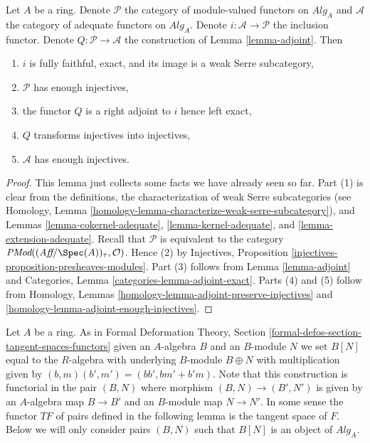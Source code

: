 \begin{lemma}
\label{lemma-enough-injectives}
Let $A$ be a ring. Denote $\mathcal{P}$ the category of module-valued
functors on $\textit{Alg}_A$ and $\mathcal{A}$ the category of adequate
functors on $\textit{Alg}_A$. Denote $i : \mathcal{A} \to \mathcal{P}$
the inclusion functor. Denote $Q : \mathcal{P} \to \mathcal{A}$
the construction of Lemma \ref{lemma-adjoint}.
Then
\begin{enumerate}
\item $i$ is fully faithful, exact, and its image is a weak Serre subcategory,
\item $\mathcal{P}$ has enough injectives,
\item the functor $Q$ is a right adjoint to $i$ hence left exact,
\item $Q$ transforms injectives into injectives,
\item $\mathcal{A}$ has enough injectives.
\end{enumerate}
\end{lemma}

\begin{proof}
This lemma just collects some facts we have already seen so far.
Part (1) is clear from the definitions, the characterization of
weak Serre subcategories (see
Homology, Lemma \ref{homology-lemma-characterize-weak-serre-subcategory}),
and
Lemmas \ref{lemma-cokernel-adequate}, \ref{lemma-kernel-adequate},
and \ref{lemma-extension-adequate}.
Recall that $\mathcal{P}$ is equivalent to the category
$\textit{PMod}((\textit{Aff}/\Spec(A))_\tau, \mathcal{O})$.
Hence (2) by
Injectives, Proposition \ref{injectives-proposition-presheaves-modules}.
Part (3) follows from
Lemma \ref{lemma-adjoint}
and
Categories, Lemma \ref{categories-lemma-adjoint-exact}.
Parts (4) and (5) follow from
Homology, Lemmas \ref{homology-lemma-adjoint-preserve-injectives} and
\ref{homology-lemma-adjoint-enough-injectives}.
\end{proof}

\noindent
Let $A$ be a ring. As in
Formal Deformation Theory, Section
\ref{formal-defos-section-tangent-spaces-functors}
given an $A$-algebra $B$ and an $B$-module $N$ we set $B[N]$ equal to
the $R$-algebra with underlying $B$-module $B \oplus N$ with multiplication
given by $(b, m)(b', m ') = (bb', bm' + b'm)$. Note that this construction
is functorial in the pair $(B, N)$ where morphism $(B, N) \to (B', N')$
is given by an $A$-algebra map $B \to B'$ and an $B$-module map
$N \to N'$. In some sense the functor $TF$ of pairs defined in the following
lemma is the tangent space of $F$.
Below we will only consider pairs $(B, N)$ such that
$B[N]$ is an object of $\textit{Alg}_A$.

